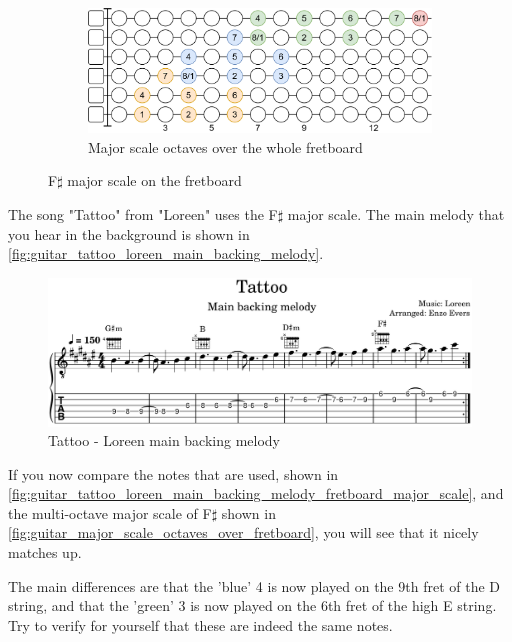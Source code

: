 \begin{figure}[h]
	\vspace{0.5cm}
	\begin{subfigure}[b]{\textwidth}
		\centering
		\includegraphics[height=0.18\textheight]{../../Images/guitar_major_scale_octaves_over_fretboard.png}
		\caption{Major scale octaves over the whole fretboard}
		\label{fig:guitar_major_scale_octaves_over_fretboard}
	\end{subfigure}
	
	\caption{F$\sharp$ major scale on the fretboard}
	\label{fig:guitar_major_scale_fretboard}
\end{figure}

\clearpage

The song "Tattoo" from "Loreen" uses the F$\sharp$ major scale. The main melody that you hear in the background is shown in \autoref{fig:guitar_tattoo_loreen_main_backing_melody}.

\begin{figure}[h]
	\centering
	\includegraphics[width=\textwidth]{../../MuseScore/Guitar/LoreenTattooSimpleBackingMelody.png}
	\caption{Tattoo - Loreen main backing melody}
	\label{fig:guitar_tattoo_loreen_main_backing_melody}
\end{figure}

If you now compare the notes that are used, shown in \autoref{fig:guitar_tattoo_loreen_main_backing_melody_fretboard_major_scale}, and the multi-octave major scale of F$\sharp$ shown in \autoref{fig:guitar_major_scale_octaves_over_fretboard}, you will see that it nicely matches up.

The main differences are that the 'blue' 4 is now played on the 9th fret of the D string, and that the 'green' 3 is now played on the 6th fret of the high E string. Try to verify for yourself that these are indeed the same notes.

